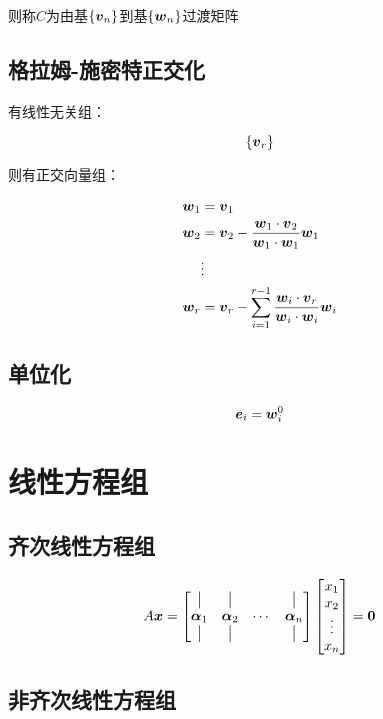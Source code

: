 \documentclass{article}
\begin{document}
则称$C$为由基$\left\{\boldsymbol v_n\right\}$到基$\left\{\boldsymbol w_n\right\}$过渡矩阵

\subsection{格拉姆-施密特正交化}\label{Orthogonalization}

有线性无关组：

\[\left\{\boldsymbol v_r\right\}\]

则有正交向量组：

\[\begin{aligned}
        \boldsymbol w_1 & =\boldsymbol v_1                                                         \\
        \boldsymbol w_2 & =\boldsymbol v_2-\frac{\boldsymbol w_1\cdot\boldsymbol v_2}{\boldsymbol w_1\cdot\boldsymbol w_1}\boldsymbol w_1                 \\
             & \vdots                                                        \\
        \boldsymbol w_r & =\boldsymbol v_r-\sum_{i=1}^{r-1}\frac{\boldsymbol w_i\cdot\boldsymbol v_r}{\boldsymbol w_i\cdot\boldsymbol w_i}\boldsymbol w_i
    \end{aligned}\]

\subsection{单位化}

\[\boldsymbol e_i=\boldsymbol w_i^0\]

\section{线性方程组}

\subsection{齐次线性方程组}

\[\def\av{\boldsymbol{\mathrm\alpha}}
    A\xv=
    \begin{bmatrix}
        \big| & \big| &        & \big| \\
        \av_1 & \av_2 & \cdots & \av_n \\
        \big| & \big| &        & \big|
    \end{bmatrix}
    \begin{bmatrix}
        x_1    \\
        x_2    \\
        \vdots \\
        x_n
    \end{bmatrix}=
    \boldsymbol0\]

\subsection{非齐次线性方程组}
\end{document}
